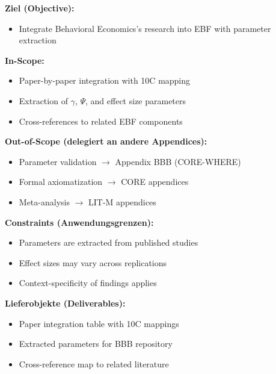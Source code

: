 
\begin{tcolorbox}[
    colback=orange!5!white,
    colframe=orange!75!black,
    title={\textbf{Appendix Scope: Ziel / In-Scope / Out-of-Scope / Constraints}},
    fonttitle=\bfseries
]

\textbf{Ziel (Objective):}
\begin{itemize}[nosep]
    \item Integrate Behavioral Economics's research into EBF with parameter extraction
\end{itemize}

\textbf{In-Scope:}
\begin{itemize}[nosep]
    \item Paper-by-paper integration with 10C mapping
    \item Extraction of $\gamma$, $\Psi$, and effect size parameters
    \item Cross-references to related EBF components
\end{itemize}

\textbf{Out-of-Scope (delegiert an andere Appendices):}
\begin{itemize}[nosep]
    \item Parameter validation $\rightarrow$ Appendix BBB (CORE-WHERE)
    \item Formal axiomatization $\rightarrow$ CORE appendices
    \item Meta-analysis $\rightarrow$ LIT-M appendices
\end{itemize}

\textbf{Constraints (Anwendungsgrenzen):}
\begin{itemize}[nosep]
    \item Parameters are extracted from published studies
    \item Effect sizes may vary across replications
    \item Context-specificity of findings applies
\end{itemize}

\textbf{Lieferobjekte (Deliverables):}
\begin{itemize}[nosep]
    \item Paper integration table with 10C mappings
    \item Extracted parameters for BBB repository
    \item Cross-reference map to related literature
\end{itemize}

\end{tcolorbox}

